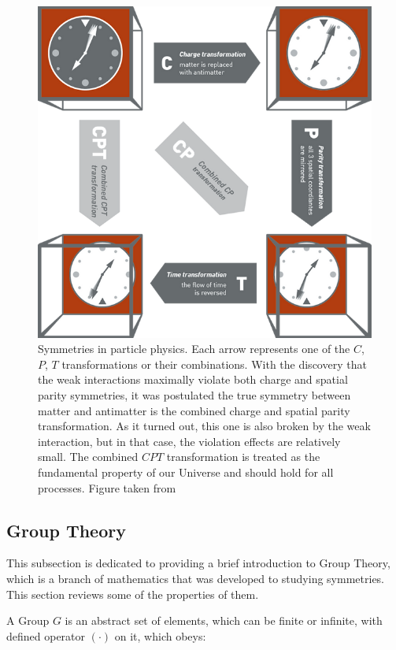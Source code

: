 \begin{figure}
\centering
\includegraphics[scale=1.0]{figures/CPT.png}
\caption{Symmetries in particle physics. Each arrow represents one of the $C$, $P$, $T$ transformations or their combinations. With the discovery that the weak interactions maximally violate both charge and spatial parity symmetries, it was postulated the true symmetry between matter and antimatter is the combined charge and spatial parity transformation. As it turned out, this one is also broken by the weak interaction, but in that case, the violation effects are relatively small. The combined $CPT$ transformation is treated as the fundamental property of our Universe and should hold for all processes. Figure taken from \cite{CPT}
\label{fig:CPT}}
\end{figure}

\subsection{Group Theory}
This subsection is dedicated to providing a brief introduction to Group Theory, which is a branch of mathematics that was developed to studying symmetries. This section reviews some of the properties of them.

A Group $G$ is an abstract set of elements, which can be finite or infinite, with defined operator $(\cdot)$ on it, which obeys:

